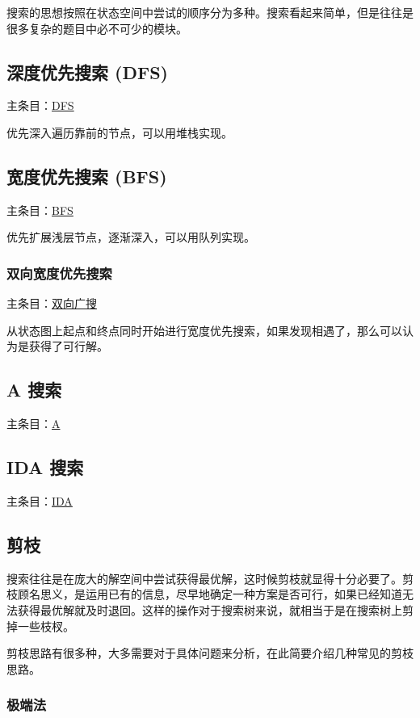 
搜索的思想按照在状态空间中尝试的顺序分为多种。搜索看起来简单，但是往往是很多复杂的题目中必不可少的模块。

\subsection{深度优先搜索 (DFS)}

主条目：\href{/search/dfs/}{DFS}

优先深入遍历靠前的节点，可以用堆栈实现。

\subsection{宽度优先搜索 (BFS)}

主条目：\href{/search/bfs/}{BFS}

优先扩展浅层节点，逐渐深入，可以用队列实现。

\subsubsection{双向宽度优先搜索}

主条目：\href{/search/dbfs/}{双向广搜}

从状态图上起点和终点同时开始进行宽度优先搜索，如果发现相遇了，那么可以认为是获得了可行解。

\subsection{A 搜索}

主条目：\href{/search/astar/}{A}

\subsection{IDA 搜索}

主条目：\href{/search/idastar/}{IDA}

\subsection{剪枝}

搜索往往是在庞大的解空间中尝试获得最优解，这时候剪枝就显得十分必要了。剪枝顾名思义，是运用已有的信息，尽早地确定一种方案是否可行，如果已经知道无法获得最优解就及时退回。这样的操作对于搜索树来说，就相当于是在搜索树上剪掉一些枝杈。

剪枝思路有很多种，大多需要对于具体问题来分析，在此简要介绍几种常见的剪枝思路。

\subsubsection{极端法}

